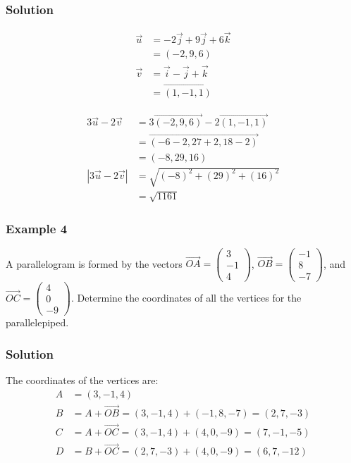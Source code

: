 \documentclass{article}
\begin{document}
\subsubsection*{Solution}
\begin{minipage}{0.5\textwidth}
\begin{align*}
\vec{u}&=-2\vec{j}+9\vec{j}+6\vec{k}\\
&=(-2,9,6)\\
\vec{v}&=\vec{i}-\vec{j}+\vec{k}\\
&=\overrightarrow{(1,-1,1)}
\end{align*}
\end{minipage}
\begin{minipage}{0.5\textwidth}
\begin{align*}
3\vec{u}-2\vec{v}&=3\overrightarrow{(-2,9,6)}-2\overrightarrow{(1,-1,1)}\\
    &=\overrightarrow{(-6-2,27+2,18-2)}\\
    &=(-8,29,16)\\
    |3\vec{u}-2\vec{v}|&=\sqrt{(-8)^2+(29)^2+(16)^2}\\
    &=\sqrt{1161}
\end{align*}
\end{minipage}
\subsubsection*{Example 4}
A parallelogram is formed by the vectors $\overrightarrow{OA}=\begin{pmatrix} 3 \\ -1 \\ 4 \end{pmatrix}$, $\overrightarrow{OB}=\begin{pmatrix} -1 \\ 8 \\ -7 \end{pmatrix}$, and $\overrightarrow{OC}=\begin{pmatrix} 4 \\ 0 \\ -9 \end{pmatrix}$. Determine the coordinates of all the vertices for the parallelepiped.
\subsubsection*{Solution}
The coordinates of the vertices are:
\begin{align*}
A &= (3, -1, 4) \\
B &= A + \overrightarrow{OB} = (3, -1, 4) + (-1, 8, -7) = (2, 7, -3) \\
C &= A + \overrightarrow{OC} = (3, -1, 4) + (4, 0, -9) = (7, -1, -5) \\
D &= B + \overrightarrow{OC} = (2, 7, -3) + (4, 0, -9) = (6, 7, -12)
\end{align*}
\end{document}
